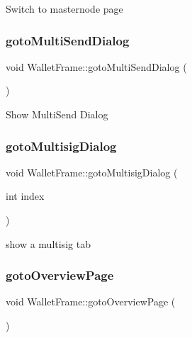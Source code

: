 Switch to masternode page \mbox{\label{class_wallet_frame_a4422d7faeabc6ea3eb09c7b195a362bb}} 
\subsubsection{\texorpdfstring{gotoMultiSendDialog}{gotoMultiSendDialog}}
{\footnotesize\ttfamily void Wallet\+Frame\+::goto\+Multi\+Send\+Dialog (\begin{DoxyParamCaption}{ }\end{DoxyParamCaption})\hspace{0.3cm}{\ttfamily [slot]}}

Show Multi\+Send Dialog \mbox{\label{class_wallet_frame_af4fff0e71372888b35c447b08eb37aaf}} 
\subsubsection{\texorpdfstring{gotoMultisigDialog}{gotoMultisigDialog}}
{\footnotesize\ttfamily void Wallet\+Frame\+::goto\+Multisig\+Dialog (\begin{DoxyParamCaption}\item[{int}]{index }\end{DoxyParamCaption})\hspace{0.3cm}{\ttfamily [slot]}}

show a multisig tab \mbox{\label{class_wallet_frame_a44a96de92558a91a95142943484c88e8}} 
\subsubsection{\texorpdfstring{gotoOverviewPage}{gotoOverviewPage}}
{\footnotesize\ttfamily void Wallet\+Frame\+::goto\+Overview\+Page (\begin{DoxyParamCaption}{ }\end{DoxyParamCaption})\hspace{0.3cm}{\ttfamily [slot]}}

